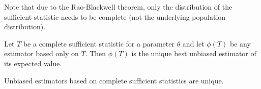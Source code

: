Note that due to the Rao-Blackwell theorem, only the distribution of the sufficient statistic needs to be complete (not the underlying population distribution).

\begin{theorem}
    Let $T$ be a complete sufficient statistic for a parameter $\theta$ and let $\phi(T)$ be any estimator based only on $T$. Then $\phi(T)$ is the unique best unbiased estimator of its expected value.
\end{theorem}

\begin{theorem}
    Unbiased estimators based on complete sufficient statistics are unique.
\end{theorem}

